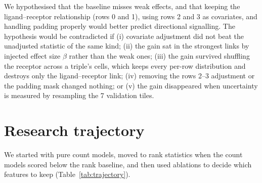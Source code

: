 \documentclass{article}
\begin{document}
We hypothesised that the baseline misses weak effects, and that keeping the ligand--receptor relationship
(rows 0 and 1), using rows 2 and 3 as covariates, and handling padding properly would better predict directional
signalling. The hypothesis would be contradicted if (i) covariate adjustment did not beat the unadjusted statistic
of the same kind; (ii) the gain sat in the strongest links by injected effect size $\beta$ rather than the weak
ones; (iii) the gain survived shuffling the receptor across a triple's cells, which keeps every per-row
distribution and destroys only the ligand--receptor link; (iv) removing the rows 2--3 adjustment or the padding
mask changed nothing; or (v) the gain disappeared when uncertainty is measured by resampling the 7 validation tiles.

\section{Research trajectory}
We started with pure count models, moved to rank statistics when the count models scored below the rank
baseline, and then used ablations to decide which features to keep (Table~\ref{tab:trajectory}).
\end{document}
